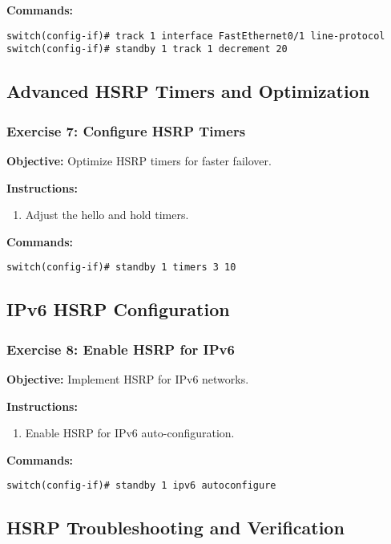 \documentclass[12pt]{article}
\begin{document}
\textbf{Commands:}
\begin{lstlisting}[style=CiscoCLI]
switch(config-if)# track 1 interface FastEthernet0/1 line-protocol
switch(config-if)# standby 1 track 1 decrement 20
\end{lstlisting}

\bigskip

\subsection{Advanced HSRP Timers and Optimization}

\subsubsection*{Exercise 7: Configure HSRP Timers}
\textbf{Objective:} Optimize HSRP timers for faster failover.

\textbf{Instructions:}
\begin{enumerate}
\item Adjust the hello and hold timers.
\end{enumerate}

\textbf{Commands:}
\begin{lstlisting}[style=CiscoCLI]
switch(config-if)# standby 1 timers 3 10
\end{lstlisting}

\bigskip

\subsection{IPv6 HSRP Configuration}

\subsubsection*{Exercise 8: Enable HSRP for IPv6}
\textbf{Objective:} Implement HSRP for IPv6 networks.

\textbf{Instructions:}
\begin{enumerate}
\item Enable HSRP for IPv6 auto-configuration.
\end{enumerate}

\textbf{Commands:}
\begin{lstlisting}[style=CiscoCLI]
switch(config-if)# standby 1 ipv6 autoconfigure
\end{lstlisting}

\bigskip

\subsection{HSRP Troubleshooting and Verification}
\end{document}
